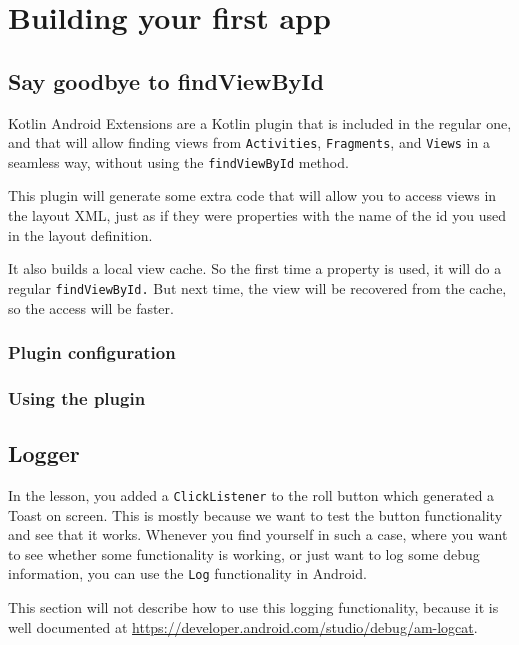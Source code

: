 
\chapter{Building your first app}

\section{Say goodbye to findViewById }

Kotlin Android Extensions are a Kotlin plugin that is included in the regular one, and that will allow finding views from \lstinline|Activities|, \lstinline|Fragments|, and \lstinline|Views| in a seamless way, without using the \lstinline|findViewById| method.

This plugin will generate some extra code that will allow you to access views in the layout XML, just as if they were properties with the name of the id you used in the layout definition.

It also builds a local view cache. So the first time a property is used, it will do a regular \lstinline|findViewById.| But next time, the view will be recovered from the cache, so the access will be faster.

\subsection{Plugin configuration}


\subsection{Using the plugin}


\section{Logger}
In the lesson, you added a \lstinline|ClickListener| to the roll button which generated a Toast on screen. This is mostly because we want to test the button functionality and see that it works. Whenever you find yourself in such a case, where you want to see whether some functionality is working, or just want to log some debug information, you can use the \lstinline|Log| functionality in Android. 

This section will not describe how to use this logging functionality, because it is well documented at \url{https://developer.android.com/studio/debug/am-logcat}. 

